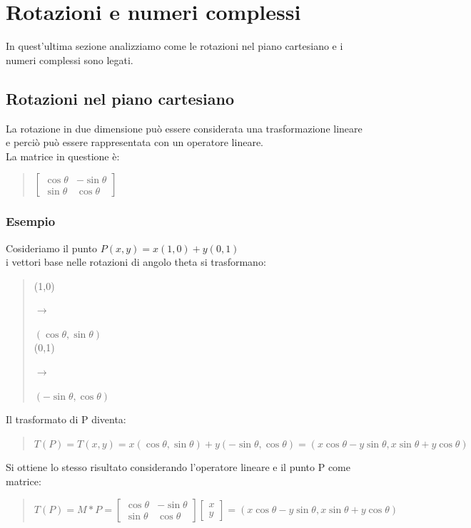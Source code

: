 \documentclass[a4paper]{article}
\begin{document}
\section{Rotazioni e numeri complessi}
In quest'ultima sezione analizziamo come le rotazioni nel piano cartesiano e i numeri complessi sono legati.
\subsection{Rotazioni nel piano cartesiano}
La rotazione in due dimensione può essere considerata una trasformazione lineare e perciò può essere rappresentata con un operatore lineare.
\\ La matrice in questione è: 
\begin{quote} \centering $\left[\begin{matrix}\cos\theta & -\sin\theta\\ \sin\theta & \cos\theta\end{matrix}\right]
$\end{quote}
\subsubsection{Esempio}
Cosideriamo il punto $P(x,y)= x(1,0)+y(0,1)$
\\ i vettori base nelle rotazioni di angolo theta si trasformano: 
\begin{quote} \centering (1,0) \begin{large} $\rightarrow$ \end{large} $(\cos\theta, \sin\theta)
$ \\
(0,1) \begin{large} $\rightarrow$ \end{large} $(-\sin\theta, \cos\theta)
$ \end{quote}
Il trasformato di P diventa:
\begin{quote} \centering $T(P)=T(x,y)=x(\cos\theta,\sin\theta)+y(-\sin\theta,\cos\theta)= (x\cos\theta-y\sin\theta,x\sin\theta+y\cos\theta)
$\end{quote}
Si ottiene lo stesso risultato considerando l'operatore lineare e il punto P come matrice:
\begin{quote} \centering $T(P)= M*P=\left[\begin{matrix}\cos\theta & -\sin\theta\\ \sin\theta & \cos\theta\end{matrix}\right]\left[\begin{matrix}x\\ y\end{matrix}\right]=(x\cos\theta-y\sin\theta,x\sin\theta+y\cos\theta)
$\end{quote}
\end{document}
